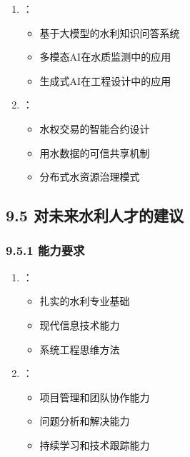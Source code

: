 
\begin{enumerate}
\def\labelenumi{\arabic{enumi}.}
\tightlist
\item
  ：

  \begin{itemize}
  \tightlist
  \item
    基于大模型的水利知识问答系统
  \item
    多模态AI在水质监测中的应用
  \item
    生成式AI在工程设计中的应用
  \end{itemize}
\item
  ：

  \begin{itemize}
  \tightlist
  \item
    水权交易的智能合约设计
  \item
    用水数据的可信共享机制
  \item
    分布式水资源治理模式
  \end{itemize}
\end{enumerate}

\hypertarget{ux5bf9ux672aux6765ux6c34ux5229ux4ebaux624dux7684ux5efaux8bae}{%
\subsection{9.5 对未来水利人才的建议}\label{ux5bf9ux672aux6765ux6c34ux5229ux4ebaux624dux7684ux5efaux8bae}}

\hypertarget{ux80fdux529bux8981ux6c42}{%
\subsubsection{9.5.1 能力要求}\label{ux80fdux529bux8981ux6c42}}


\begin{enumerate}
\def\labelenumi{\arabic{enumi}.}
\tightlist
\item
  ：

  \begin{itemize}
  \tightlist
  \item
    扎实的水利专业基础
  \item
    现代信息技术能力
  \item
    系统工程思维方法
  \end{itemize}
\item
  ：

  \begin{itemize}
  \tightlist
  \item
    项目管理和团队协作能力
  \item
    问题分析和解决能力
  \item
    持续学习和技术跟踪能力
  \end{itemize}
\end{enumerate}

